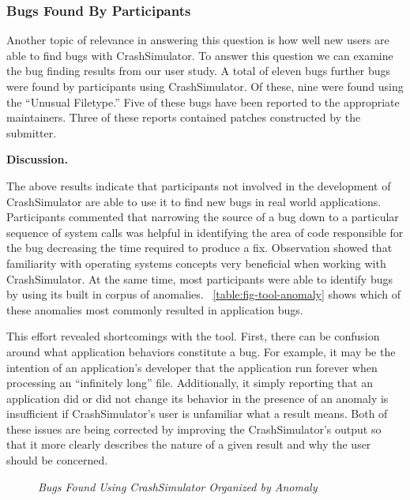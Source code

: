 \subsubsection{Bugs Found By Participants}

Another topic of relevance in answering this question is how well new users are
able to find bugs with CrashSimulator.
To answer this question we can examine the bug finding results from our user
study.
A total of eleven bugs further bugs were found by participants using
CrashSimulator.  Of these, nine were found using the ``Unusual Filetype.''
Five of these bugs have been reported to the appropriate maintainers.
Three of these reports contained patches constructed by the submitter.

{\bf Discussion. }

The above results indicate that participants
not involved in the development of
CrashSimulator are able to use it to find new bugs in real world
applications.  Participants commented that narrowing the source of a bug
down to a particular sequence of system calls
was helpful in identifying the area of
code responsible for the bug decreasing the time required to produce a fix.
Observation showed that familiarity with operating systems concepts
very beneficial when working with CrashSimulator.  At
the same time, most participants were
able to identify bugs by using its built in corpus of
anomalies. ~\ref{table:fig-tool-anomaly} shows which
of these anomalies most commonly
resulted in application bugs.

This effort revealed shortcomings with the tool.  First,  there can be
confusion around what application behaviors constitute a bug.  For example,
it may be the intention of an application's developer that the application
run forever when processing an ``infinitely long'' file.  Additionally, it
simply reporting that an application did or did not change its behavior in
the presence of an anomaly is insufficient if CrashSimulator's user is
unfamiliar what a result means.  Both of these issues are being corrected
by improving the CrashSimulator's output so that it more clearly describes
the nature of a given result and why the user should be concerned.

\begin{figure}[t]
  \center{}
  \caption{\emph{Bugs Found Using CrashSimulator Organized by Anomaly}}
  \label{fig-tool-anomaly}
\end{figure}

